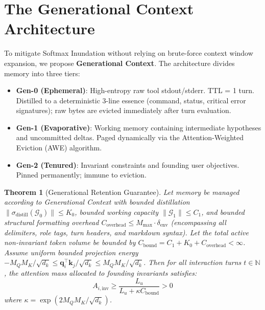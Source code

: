 \documentclass[11pt,a4paper]{article}
\newtheorem{theorem}{Theorem}
\begin{document}
\section{The Generational Context Architecture}
\label{sec:generational_context}

To mitigate Softmax Inundation without relying on brute-force context window expansion, we propose \textbf{Generational Context}. The architecture divides memory into three tiers:
\begin{itemize}
    \item \textbf{Gen-0 (Ephemeral)}: High-entropy raw tool stdout/stderr. TTL = 1 turn. Distilled to a deterministic 3-line essence (command, status, critical error signatures); raw bytes are evicted immediately after turn evaluation.
    \item \textbf{Gen-1 (Evaporative)}: Working memory containing intermediate hypotheses and uncommitted deltas. Paged dynamically via the Attention-Weighted Eviction (AWE) algorithm.
    \item \textbf{Gen-2 (Tenured)}: Invariant constraints and founding user objectives. Pinned permanently; immune to eviction.
\end{itemize}

\begin{theorem}[Generational Retention Guarantee]
\label{thm:retention}
Let memory be managed according to Generational Context with bounded distillation $\|\sigma_{\text{distill}}(\mathcal{G}_0)\| \le K_0$, bounded working capacity $\|\mathcal{G}_1\| \le C_1$, and bounded structural formatting overhead $C_{\text{overhead}} \le M_{\max} \cdot \delta_{\text{env}}$ (encompassing all delimiters, role tags, turn headers, and markdown syntax). Let the total active non-invariant token volume be bounded by $C_{\text{bound}} = C_1 + K_0 + C_{\text{overhead}} < \infty$. Assume uniform bounded projection energy $-M_Q M_K / \sqrt{d_k} \le \mathbf{q}_i^\top \mathbf{k}_j / \sqrt{d_k} \le M_Q M_K / \sqrt{d_k}$. Then for all interaction turns $t \in \mathbb{N}$, the attention mass allocated to founding invariants satisfies:
\begin{equation}
    A_{i, \text{inv}} \ge \frac{L_u}{L_u + \kappa C_{\text{bound}}} > 0
\end{equation}
where $\kappa = \exp(2 M_Q M_K / \sqrt{d_k})$.
\end{theorem}
\end{document}
